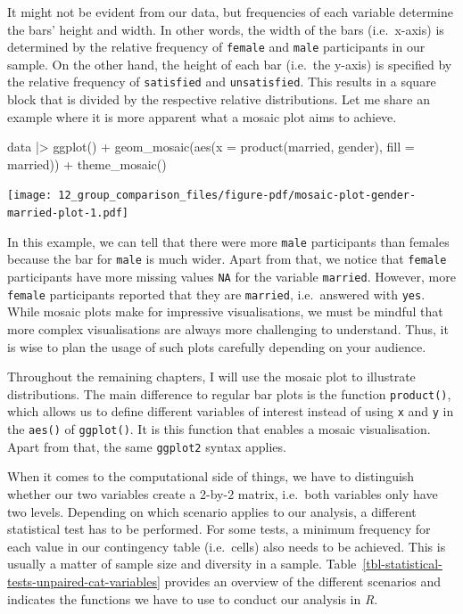 \documentclass[
  letterpaper,
]{krantz}
\makeatletter
\newenvironment{Shaded}{\begin{snugshade}}{\end{snugshade}}
\newcommand{\AttributeTok}[1]{\textcolor[rgb]{0.40,0.45,0.13}{#1}}
\newcommand{\FunctionTok}[1]{\textcolor[rgb]{0.28,0.35,0.67}{#1}}
\newcommand{\NormalTok}[1]{\textcolor[rgb]{0.00,0.23,0.31}{#1}}
\newcommand{\SpecialCharTok}[1]{\textcolor[rgb]{0.37,0.37,0.37}{#1}}
\newenvironment{kframe}{%
\medskip{}
\setlength{\fboxsep}{.8em}
 \def\at@end@of@kframe{}%
 \ifinner\ifhmode%
  \def\at@end@of@kframe{\end{minipage}}%
  \begin{minipage}{\columnwidth}%
 \fi\fi%
 \def\FrameCommand##1{\hskip\@totalleftmargin \hskip-\fboxsep
 \colorbox{shadecolor}{##1}\hskip-\fboxsep
     \hskip-\linewidth \hskip-\@totalleftmargin \hskip\columnwidth}%
 \MakeFramed {\advance\hsize-\width
   \@totalleftmargin\z@ \linewidth\hsize
   \@setminipage}}%
 {\par\unskip\endMakeFramed%
 \at@end@of@kframe}
\renewenvironment{Shaded}{\begin{kframe}}{\end{kframe}}
\makeatother
\begin{document}
It might not be evident from our data, but frequencies of each variable
determine the bars' height and width. In other words, the width of the
bars (i.e.~x-axis) is determined by the relative frequency of
\texttt{female} and \texttt{male} participants in our sample. On the
other hand, the height of each bar (i.e.~the y-axis) is specified by the
relative frequency of \texttt{satisfied} and \texttt{unsatisfied}. This
results in a square block that is divided by the respective relative
distributions. Let me share an example where it is more apparent what a
mosaic plot aims to achieve.

\begin{Shaded}
\begin{Highlighting}[]
\NormalTok{data }\SpecialCharTok{|\textgreater{}}
  \FunctionTok{ggplot}\NormalTok{() }\SpecialCharTok{+}
  \FunctionTok{geom\_mosaic}\NormalTok{(}\FunctionTok{aes}\NormalTok{(}\AttributeTok{x =} \FunctionTok{product}\NormalTok{(married, gender),}
                  \AttributeTok{fill =}\NormalTok{ married)) }\SpecialCharTok{+}
  \FunctionTok{theme\_mosaic}\NormalTok{()}
\end{Highlighting}
\end{Shaded}

\texttt{[image: 12\_group\_comparison\_files/figure-pdf/mosaic-plot-gender-married-plot-1.pdf]}

In this example, we can tell that there were more \texttt{male}
participants than females because the bar for \texttt{male} is much
wider. Apart from that, we notice that \texttt{female} participants have
more missing values \texttt{NA} for the variable \texttt{married}.
However, more \texttt{female} participants reported that they are
\texttt{married}, i.e.~answered with \texttt{yes}. While mosaic plots
make for impressive visualisations, we must be mindful that more complex
visualisations are always more challenging to understand. Thus, it is
wise to plan the usage of such plots carefully depending on your
audience.

Throughout the remaining chapters, I will use the mosaic plot to
illustrate distributions. The main difference to regular bar plots is
the function \texttt{product()}, which allows us to define different
variables of interest instead of using \texttt{x} and \texttt{y} in the
\texttt{aes()} of \texttt{ggplot()}. It is this function that enables a
mosaic visualisation. Apart from that, the same \texttt{ggplot2} syntax
applies.

When it comes to the computational side of things, we have to
distinguish whether our two variables create a 2-by-2 matrix, i.e.~both
variables only have two levels. Depending on which scenario applies to
our analysis, a different statistical test has to be performed. For some
tests, a minimum frequency for each value in our contingency table
(i.e.~cells) also needs to be achieved. This is usually a matter of
sample size and diversity in a sample.
Table~\ref{tbl-statistical-tests-unpaired-cat-variables} provides an
overview of the different scenarios and indicates the functions we have
to use to conduct our analysis in \emph{R}.
\end{document}
